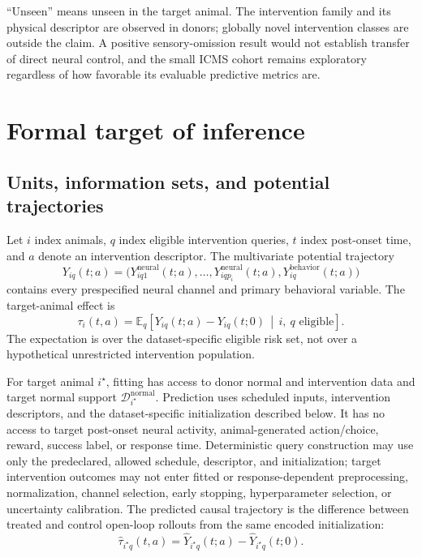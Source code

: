 \documentclass[11pt]{article}
\newcommand{\E}{\mathbb{E}}
\newcommand{\normal}{\mathrm{normal}}
\newcommand{\given}{\,\middle|\,}
\begin{document}
``Unseen'' means unseen in the target animal. The intervention family and its
physical descriptor are observed in donors; globally novel intervention
classes are outside the claim. A positive sensory-omission result would not
establish transfer of direct neural control, and the small ICMS cohort remains
exploratory regardless of how favorable its evaluable predictive metrics are.



\section{Formal target of inference}
\label{sec:estimand}

\subsection{Units, information sets, and potential trajectories}

Let \(i\) index animals, \(q\) index eligible intervention queries, \(t\) index
post-onset time, and \(a\) denote an intervention descriptor. The multivariate
potential trajectory
\[
  Y_{iq}(t;a)
  =
  \bigl(
    Y^{\mathrm{neural}}_{iq1}(t;a),\ldots,
    Y^{\mathrm{neural}}_{iqp_i}(t;a),
    Y^{\mathrm{behavior}}_{iq}(t;a)
  \bigr)
\]
contains every prespecified neural channel and primary behavioral variable.
The target-animal effect is
\begin{equation}
  \tau_i(t,a)
  =
  \E_q\!\left[
    Y_{iq}(t;a)-Y_{iq}(t;0)
    \given i,\ q\text{ eligible}
  \right].
  \label{eq:estimand}
\end{equation}
The expectation is over the dataset-specific eligible risk set, not over a
hypothetical unrestricted intervention population.

For target animal \(i^\star\), fitting has access to donor normal and
intervention data and target normal support
\(\mathcal{D}_{i^\star}^{\normal}\). Prediction uses scheduled inputs,
intervention descriptors, and the dataset-specific initialization described
below. It has no access to
target post-onset neural activity, animal-generated action/choice, reward,
success label, or response time. Deterministic query construction may use only the predeclared,
allowed schedule, descriptor, and initialization; target intervention
outcomes may not enter fitted or response-dependent preprocessing,
normalization, channel selection, early stopping, hyperparameter selection, or
uncertainty calibration. The predicted causal trajectory is the difference
between treated and control open-loop rollouts from the same encoded
initialization:
\[
  \widehat{\tau}_{i^\star q}(t,a)
  =
  \widehat{Y}_{i^\star q}(t;a)
  -
  \widehat{Y}_{i^\star q}(t;0).
\]
\end{document}
